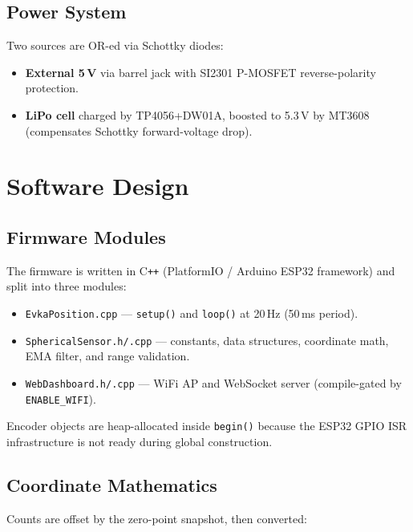 \documentclass[11pt,a4paper]{article}
\begin{document}
\subsection{Power System}

Two sources are OR-ed via Schottky diodes:

\begin{itemize}[noitemsep, topsep=4pt]
  \item \textbf{External 5\,V} via barrel jack with SI2301 P-MOSFET
        reverse-polarity protection.
  \item \textbf{LiPo cell} charged by TP4056+DW01A, boosted to 5.3\,V
        by MT3608 (compensates Schottky forward-voltage drop).
\end{itemize}

\section{Software Design}
\label{sec:sw}

\subsection{Firmware Modules}

The firmware is written in C\texttt{++} (PlatformIO / Arduino ESP32
framework) and split into three modules:

\begin{itemize}[noitemsep, topsep=4pt]
  \item \texttt{EvkaPosition.cpp} --- \texttt{setup()} and
        \texttt{loop()} at 20\,Hz (50\,ms period).
  \item \texttt{SphericalSensor.h/.cpp} --- constants, data structures,
        coordinate math, EMA filter, and range validation.
  \item \texttt{WebDashboard.h/.cpp} --- WiFi AP and WebSocket server
        (compile-gated by \texttt{ENABLE\_WIFI}).
\end{itemize}

Encoder objects are heap-allocated inside \texttt{begin()} because
the ESP32 GPIO ISR infrastructure is not ready during global
construction.

\subsection{Coordinate Mathematics}

Counts are offset by the zero-point snapshot, then converted:
\end{document}
